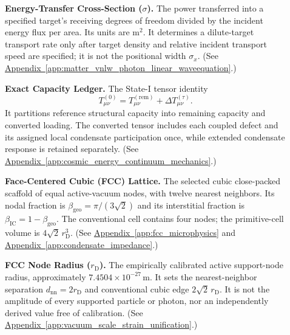 \begin{description}
\item[] \begin{minipage}[t]{\linewidth}
\textbf{Energy-Transfer Cross-Section ($\sigma$).} The power transferred into a specified target's receiving degrees of freedom divided by the incident energy flux per area. Its units are $\mathrm{m^2}$. It determines a dilute-target transport rate only after target density and relative incident transport speed are specified; it is not the positional width $\sigma_x$.
(See \hyperref[app:matter_vnlw_photon_linear_waveequation]{Appendix~\ref*{app:matter_vnlw_photon_linear_waveequation}}.)
\end{minipage}

\item[] \begin{minipage}[t]{\linewidth}
\textbf{Exact Capacity Ledger.} The State-I tensor identity
\[
 T_{\mu\nu}^{(0)}
 =T_{\mu\nu}^{(\mathrm{rem})}+\Delta T_{\mu\nu}^{(\tau)}.
\]
It partitions reference structural capacity into remaining capacity and converted loading. The converted tensor includes each coupled defect and its assigned local condensate participation once, while extended condensate response is retained separately.
(See \hyperref[app:cosmic_energy_continuum_mechanics]{Appendix~\ref*{app:cosmic_energy_continuum_mechanics}}.)
\end{minipage}

\item[] \begin{minipage}[t]{\linewidth}
\textbf{Face-Centered Cubic (FCC) Lattice.} The selected cubic close-packed scaffold of equal active-vacuum nodes, with twelve nearest neighbors. Its nodal fraction is $\beta_{\mathrm{geo}}=\pi/(3\sqrt2)$ and its interstitial fraction is $\beta_{\mathrm{IC}}=1-\beta_{\mathrm{geo}}$. The conventional cell contains four nodes; the primitive-cell volume is $4\sqrt2\,r_{\mathrm D}^3$.
(See \hyperref[app:fcc_microphysics]{Appendix~\ref*{app:fcc_microphysics}} and \hyperref[app:condensate_impedance]{Appendix~\ref*{app:condensate_impedance}}.)
\end{minipage}

\item[] \begin{minipage}[t]{\linewidth}
\textbf{FCC Node Radius ($r_{\mathrm D}$).} The empirically calibrated active support-node radius, approximately $7.4504\times10^{-27}\,\mathrm m$. It sets the nearest-neighbor separation $d_{\mathrm{nn}}=2r_{\mathrm D}$ and conventional cubic edge $2\sqrt2\,r_{\mathrm D}$. It is not the amplitude of every supported particle or photon, nor an independently derived value free of calibration.
(See \hyperref[app:vacuum_scale_strain_unification]{Appendix~\ref*{app:vacuum_scale_strain_unification}}.)
\end{minipage}


\end{description}
